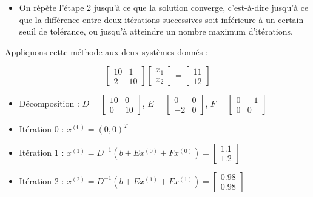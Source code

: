 \documentclass[10pt]{article}
\newenvironment{solution}
    {\par\vspace{0.5em}\begin{mdframed}[linewidth=0.5pt]\par}
    {\end{mdframed}\par\vspace{0.5em}}
\begin{document}
\begin{enumerate}
{\begin{solution}
\begin{itemize}
                \item[$\bullet$] On répète l'étape 2 jusqu'à ce que la solution converge, c'est-à-dire jusqu'à ce que la différence entre deux itérations successives soit inférieure à un certain seuil de tolérance, ou jusqu'à atteindre un nombre maximum d'itérations.
            \end{itemize}

            Appliquons cette méthode aux deux systèmes donnés :

            \[
            \left[\begin{array}{cc}
            10 & 1 \\
            2 & 10
            \end{array}\right]\left[\begin{array}{l}
            x_1 \\
            x_2
            \end{array}\right]=\left[\begin{array}{l}
            11 \\
            12
            \end{array}\right]
            \]
            \begin{itemize}
                \item[$\bullet$] Décomposition : $D = \left[\begin{array}{cc} 10 & 0 \\ 0 & 10 \end{array}\right]$, $E = \left[\begin{array}{cc} 0 & 0 \\ -2 & 0 \end{array}\right]$, $F = \left[\begin{array}{cc} 0 & -1 \\ 0 & 0 \end{array}\right]$
                \item[$\bullet$] Itération 0 : $x^{(0)} = (0,0)^T$
                \item[$\bullet$] Itération 1 : $x^{(1)} = D^{-1}(b + Ex^{(0)} + Fx^{(0)}) = \left[\begin{array}{c} 1.1 \\ 1.2 \end{array}\right]$
                \item[$\bullet$] Itération 2 : $x^{(2)} = D^{-1}(b + Ex^{(1)} + Fx^{(1)}) = \left[\begin{array}{c} 0.98 \\ 0.98 \end{array}\right]$

\end{itemize}
\end{solution}}
\end{enumerate}
\end{document}
